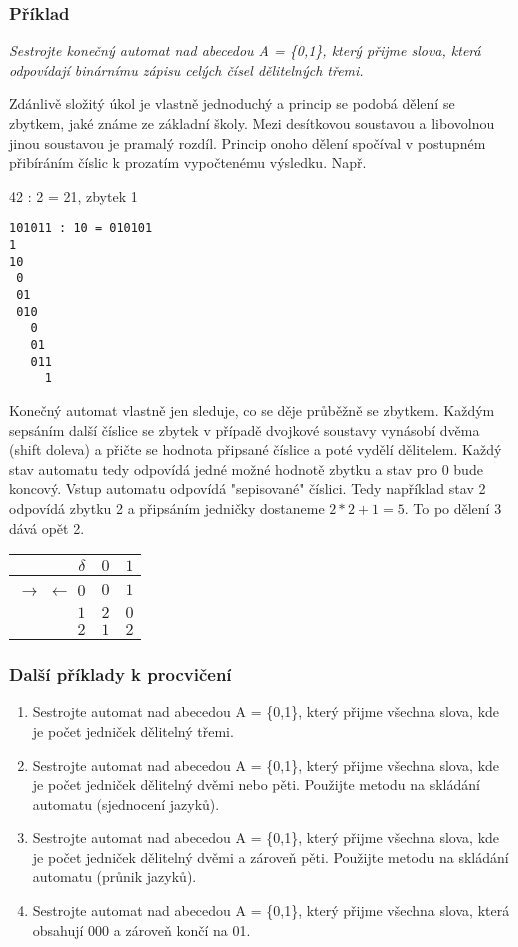 \documentclass{article}
\begin{document}
\subsubsection{Příklad}
\emph{
Sestrojte konečný automat nad abecedou A = \{0,1\}, který přijme slova, která odpovídají binárnímu zápisu celých čísel dělitelných třemi.
}

Zdánlivě složitý úkol je vlastně jednoduchý a princip se podobá dělení se zbytkem, jaké známe ze základní školy. Mezi desítkovou soustavou a libovolnou jinou soustavou je pramalý rozdíl. Princip onoho dělení spočíval v postupném přibíráním číslic k prozatím vypočtenému výsledku. Např.

42 : 2 = 21, zbytek 1

\begin{verbatim}
101011 : 10 = 010101
1
10
 0
 01
 010
   0
   01
   011
     1
\end{verbatim}


Konečný automat vlastně jen sleduje, co se děje průběžně se zbytkem. Každým sepsáním další číslice se zbytek v případě dvojkové soustavy vynásobí dvěma (shift doleva) a přičte se hodnota připsané číslice a poté vydělí dělitelem. Každý stav automatu tedy odpovídá jedné možné hodnotě zbytku a stav pro 0 bude koncový. Vstup automatu odpovídá "sepisované" číslici. Tedy například stav 2 odpovídá zbytku 2 a připsáním jedničky dostaneme $2 * 2 + 1 = 5$. To po dělení 3 dává opět 2.

\begin{tabular}{|r||c|c|}
\hline
 $\delta$ &      $0$ &   $1$\\
\hline
\hline
$\rightarrow$ $\leftarrow$ $0$ &        $0$ &   $1$\\
$1$ &   $2$ &   $0$\\
$2$ &   $1$ &   $2$\\
\hline
\end{tabular}



\subsubsection{Další příklady k procvičení}

\begin{enumerate}
  \item Sestrojte automat nad abecedou A = \{0,1\}, který přijme všechna slova, kde je počet jedniček dělitelný třemi.
  \item Sestrojte automat nad abecedou A = \{0,1\}, který přijme všechna slova, kde je počet jedniček dělitelný dvěmi nebo pěti. Použijte metodu na skládání automatu (sjednocení jazyků).
  \item Sestrojte automat nad abecedou A = \{0,1\}, který přijme všechna slova, kde je počet jedniček dělitelný dvěmi a zároveň pěti. Použijte metodu na skládání automatu (průnik jazyků).
  \item Sestrojte automat nad abecedou A = \{0,1\}, který přijme všechna slova, která obsahují 000 a zároveň končí na 01.
\end{enumerate}
\end{document}
